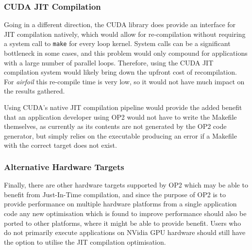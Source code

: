\subsubsection{CUDA JIT Compilation}
Going in a different direction, the CUDA library does provide an interface for JIT compilation natively, which would allow for re-compilation without requiring a system call to \verb|make| for every loop kernel. System calls can be a significant bottleneck in some cases, and this problem would only compound for applications with a large number of parallel loops. Therefore, using the CUDA JIT compilation system would likely bring down the upfront cost of recompilation. For \textit{airfoil} this re-compile time is very low, so it would not have much impact on the results gathered.
\par
Using CUDA's native JIT compilation pipeline would provide the added benefit that an application developer using OP2 would not have to write the Makefile themselves, as currently as its contents are not generated by the OP2 code generator, but simply relies on the executable producing an error if a Makefile with the correct target does not exist.

\subsubsection{Alternative Hardware Targets}
Finally, there are other hardware targets supported by OP2 which may be able to benefit from Just-In-Time compilation, and since the purpose of OP2 is to provide performance on multiple hardware platforms from a single application code any new optimisation which is found to improve performance should also be ported to other platforms, where it might be able to provide benefit. Users who do not primarily execute applications on NVidia GPU hardware should still have the option to utilise the JIT compilation optimisation.

\clearpage
